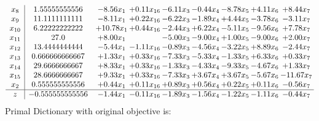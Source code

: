 \documentclass[9pt]{article}
\begin{document}
\[\begin{array}{c| c c@{\hskip 2pt} c@{\hskip 2pt} c@{\hskip 2pt} c@{\hskip 2pt} c@{\hskip 2pt} c@{\hskip 2pt} c@{\hskip 2pt} }
 x_{8}   &  1.55555555556 & -8.56 x_{1} & +  0.11 x_{16} & -6.11 x_{3} & -0.44 x_{4} & -8.78 x_{5} & +  4.11 x_{6} & +  8.44 x_{7}\\
 x_{9}   &  11.1111111111 & -8.11 x_{1} & +  0.22 x_{16} & -6.22 x_{3} & -1.89 x_{4} & +  4.44 x_{5} & -3.78 x_{6} & -3.11 x_{7}\\
 x_{10}   &  6.22222222222 & + 10.78 x_{1} & +  0.44 x_{16} & -2.44 x_{3} & +  6.22 x_{4} & -5.11 x_{5} & -9.56 x_{6} & +  7.78 x_{7}\\
 x_{11}   &  27.0 & +  8.00 x_{1} &   & -5.00 x_{3} & -9.00 x_{4} & +  1.00 x_{5} & -9.00 x_{6} & +  2.00 x_{7}\\
 x_{12}   &  13.4444444444 & -5.44 x_{1} & -1.11 x_{16} & -0.89 x_{3} & -4.56 x_{4} & -3.22 x_{5} & +  8.89 x_{6} & -2.44 x_{7}\\
 x_{13}   &  0.666666666667 & +  1.33 x_{1} & +  0.33 x_{16} & -7.33 x_{3} & -5.33 x_{4} & -1.33 x_{5} & +  6.33 x_{6} & +  0.33 x_{7}\\
 x_{14}   &  29.6666666667 & +  8.33 x_{1} & +  0.33 x_{16} & -1.33 x_{3} & -4.33 x_{4} & -9.33 x_{5} & -4.67 x_{6} & +  1.33 x_{7}\\
 x_{15}   &  28.6666666667 & +  9.33 x_{1} & +  0.33 x_{16} & -7.33 x_{3} & +  3.67 x_{4} & +  3.67 x_{5} & -5.67 x_{6} & -11.67 x_{7}\\
 x_{2}   &  0.555555555556 & +  0.44 x_{1} & +  0.11 x_{16} & +  0.89 x_{3} & +  0.56 x_{4} & +  0.22 x_{5} & +  0.11 x_{6} & -0.56 x_{7}\\
\hline
z    &  -0.555555555556 & -1.44 x_{1} & -0.11 x_{16} & -1.89 x_{3} & -1.56 x_{4} & -1.22 x_{5} & -1.11 x_{6} & -0.44 x_{7}\\
\end{array}\]
Primal Dictionary with original objective is:
\end{document}
